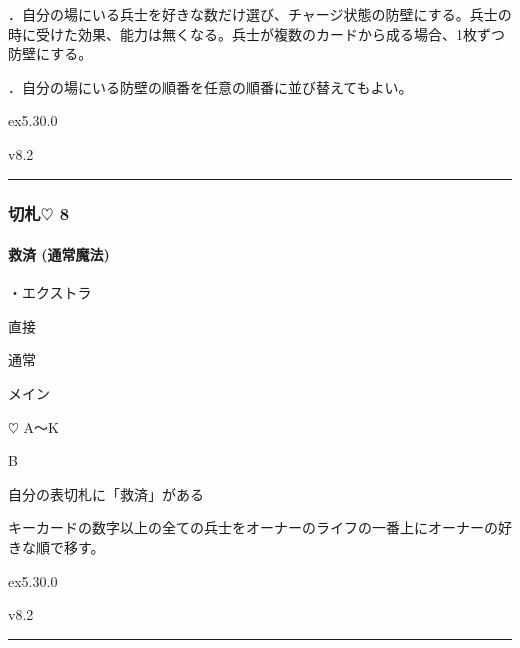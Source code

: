 \documentclass[letterpaper,10pt,dvipdfmx]{sphinxmanual}
\begin{document}
\sphinxAtStartPar
{}

．自分の場にいる兵士を好きな数だけ選び、チャージ状態の防壁にする。兵士の時に受けた効果、能力は無くなる。兵士が複数のカードから成る場合、1枚ずつ防壁にする。

．自分の場にいる防壁の順番を任意の順番に並び替えてもよい。

\sphinxAtStartPar
{}  ex5.30.0

\sphinxAtStartPar
{}  v8.2


\bigskip\hrule\bigskip



\subsubsection{切札{\normalsize $\heartsuit$} 8}
\label{\detokenize{auto/frameActionlist:id44}}

\paragraph{救済 (通常魔法)}
\label{\detokenize{auto/frameActionlist:act-salvation}}\label{\detokenize{auto/frameActionlist:id45}}
\sphinxAtStartPar
{}

\sphinxAtStartPar
・エクストラ

\sphinxAtStartPar
{} 直接

\sphinxAtStartPar
{} 通常

\sphinxAtStartPar
{} メイン

\sphinxAtStartPar
{} {\normalsize $\heartsuit$} A〜K

\sphinxAtStartPar
{} B

\sphinxAtStartPar
{}

\sphinxAtStartPar
自分の表切札に「救済」がある

\sphinxAtStartPar
{}

\sphinxAtStartPar
キーカードの数字以上の全ての兵士をオーナーのライフの一番上にオーナーの好きな順で移す。

\sphinxAtStartPar
{}  ex5.30.0

\sphinxAtStartPar
{}  v8.2


\bigskip\hrule\bigskip
\end{document}
